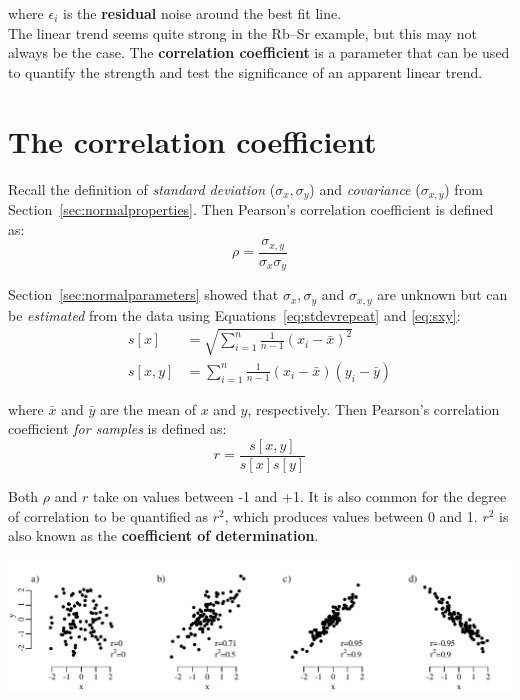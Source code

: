 \noindent where $\epsilon_i$ is the \textbf{residual} noise around the
best fit line.\\

The linear trend seems quite strong in the Rb--Sr example, but this
may not always be the case. The \textbf{correlation coefficient} is a
parameter that can be used to quantify the strength and test the
significance of an apparent linear trend.

\section{The correlation coefficient}
\label{sec:corrcoef}

Recall the definition of \emph{standard deviation} ($\sigma_x,
\sigma_y$) and \emph{covariance} ($\sigma_{x,y}$) from
Section~\ref{sec:normalproperties}. Then Pearson's correlation
coefficient is defined as:
\begin{equation}
  \rho = \frac{\sigma_{x,y}}{\sigma_x\sigma_y}
  \label{eq:rho}
\end{equation}

Section~\ref{sec:normalparameters} showed that $\sigma_x, \sigma_y$
and $\sigma_{x,y}$ are unknown but can be \emph{estimated} from the
data using Equations~\ref{eq:stdevrepeat} and \ref{eq:sxy}:
\begin{equation*}
  \begin{split}
  s[x] & = \sqrt{\sum\limits_{i=1}^{n}\frac{1}{n-1}(x_i-\bar{x})^2} \\
  s[x,y] & = \sum\limits_{i=1}^{n}\frac{1}{n-1}(x_i-\bar{x})(y_i-\bar{y})
  \end{split}
\end{equation*}

\noindent where $\bar{x}$ and $\bar{y}$ are the mean of $x$ and $y$,
respectively. Then Pearson's correlation coefficient \emph{for
  samples} is defined as:
\begin{equation}
  r = \frac{s[x,y]}{s[x]s[y]}
  \label{eq:r}
\end{equation}

Both $\rho$ and $r$ take on values between -1 and +1. It is also
common for the degree of correlation to be quantified as $r^2$, which
produces values between 0 and 1. $r^2$ is also known as the
\textbf{coefficient of determination}.

\noindent\includegraphics[width=\textwidth]{../figures/r.pdf} \begingroup
{}
\label{fig:r}
\endgroup

